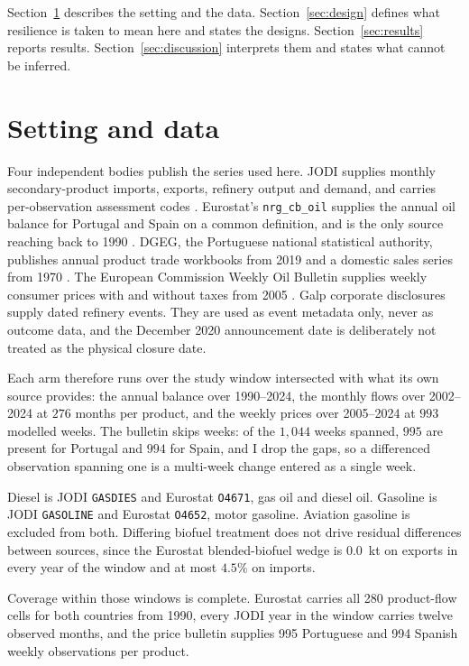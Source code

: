 \documentclass[11pt,a4paper]{article}
\begin{document}
Section~\ref{sec:setting} describes the setting and the data. Section~\ref{sec:design} defines
what resilience is taken to mean here and states the designs. Section~\ref{sec:results} reports
results. Section~\ref{sec:discussion} interprets them and states what cannot be inferred.

\section{Setting and data}
\label{sec:setting}

Four independent bodies publish the series used here. JODI supplies monthly secondary-product
imports, exports, refinery output and demand, and carries per-observation assessment codes
\citep{jodi}. Eurostat's \texttt{nrg\_cb\_oil} supplies the annual oil balance for Portugal and
Spain on a common definition, and is the only source reaching back to 1990 \citep{eurostat}.
DGEG, the Portuguese national statistical authority, publishes annual product trade workbooks
from 2019 \citep{dgegtrade} and a domestic sales series from 1970 \citep{dgegsales}. The
European Commission Weekly Oil Bulletin supplies weekly consumer prices with and without taxes
from 2005 \citep{oilbulletin}. Galp corporate disclosures supply dated refinery events. They are
used as event metadata only, never as outcome data, and the December 2020 announcement date is
deliberately not treated as the physical closure date.

Each arm therefore runs over the study window intersected with what its own source provides: the
annual balance over 1990--2024, the monthly flows over 2002--2024 at $276$ months per product,
and the weekly prices over 2005--2024 at $993$ modelled weeks. The bulletin skips weeks: of the
$1{,}044$ weeks spanned, $995$ are present for Portugal and $994$ for Spain, and I drop the
gaps, so a differenced observation spanning one is a multi-week change entered as a single week.

Diesel is JODI \texttt{GASDIES} and Eurostat \texttt{O4671}, gas oil and diesel oil. Gasoline is
JODI \texttt{GASOLINE} and Eurostat \texttt{O4652}, motor gasoline. Aviation gasoline is excluded
from both. Differing biofuel treatment does not drive residual differences between sources, since the
Eurostat blended-biofuel wedge is $0.0$~kt on exports in every year of the window and at most
$4.5\%$ on imports.

Coverage within those windows is complete. Eurostat carries all 280 product-flow cells for both
countries from 1990, every JODI year in the window carries twelve observed months, and the price
bulletin supplies 995 Portuguese and 994 Spanish weekly observations per product.
\end{document}

